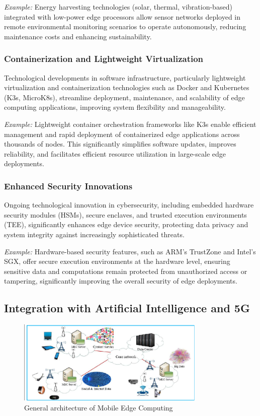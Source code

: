 \documentclass[runningheads]{llncs}
\begin{document}
\noindent\textit{Example:} Energy harvesting technologies (solar, thermal, vibration-based) integrated with low-power edge processors allow sensor networks deployed in remote environmental monitoring scenarios to operate autonomously, reducing maintenance costs and enhancing sustainability.

\subsubsection{Containerization and Lightweight Virtualization}
Technological developments in software infrastructure, particularly lightweight virtualization and containerization technologies such as Docker and Kubernetes (K3s, MicroK8s), streamline deployment, maintenance, and scalability of edge computing applications, improving system flexibility and manageability.

\noindent\textit{Example:} Lightweight container orchestration frameworks like K3s enable efficient management and rapid deployment of containerized edge applications across thousands of nodes. This significantly simplifies software updates, improves reliability, and facilitates efficient resource utilization in large-scale edge deployments.

\subsubsection{Enhanced Security Innovations}
Ongoing technological innovation in cybersecurity, including embedded hardware security modules (HSMs), secure enclaves, and trusted execution environments (TEE), significantly enhances edge device security, protecting data privacy and system integrity against increasingly sophisticated threats.

\noindent\textit{Example:} Hardware-based security features, such as ARM's TrustZone and Intel's SGX, offer secure execution environments at the hardware level, ensuring sensitive data and computations remain protected from unauthorized access or tampering, significantly improving the overall security of edge deployments.


\subsection{Integration with Artificial Intelligence and 5G}


\begin{figure}[ht]
    \centering
    \includegraphics[width=0.8\textwidth]{IMG/4.png}
    \caption{General architecture of Mobile Edge Computing}
    \label{fig:mec_architecture}
    \end{figure}
\FloatBarrier
\end{document}
